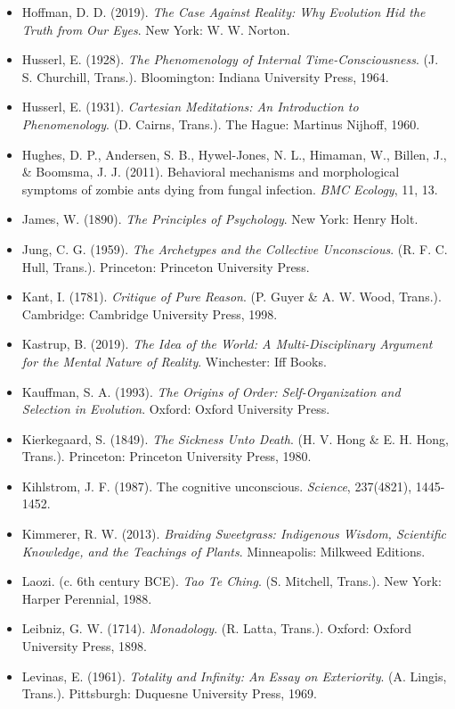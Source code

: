 \begin{itemize}[nosep,leftmargin=*]
  \item Hoffman, D. D. (2019). \textit{The Case Against Reality: Why Evolution Hid the Truth from Our Eyes}. New York: W. W. Norton.
  \item Husserl, E. (1928). \textit{The Phenomenology of Internal Time-Consciousness}. (J. S. Churchill, Trans.). Bloomington: Indiana University Press, 1964.
  \item Husserl, E. (1931). \textit{Cartesian Meditations: An Introduction to Phenomenology}. (D. Cairns, Trans.). The Hague: Martinus Nijhoff, 1960.
  \item Hughes, D. P., Andersen, S. B., Hywel-Jones, N. L., Himaman, W., Billen, J., \& Boomsma, J. J. (2011). Behavioral mechanisms and morphological symptoms of zombie ants dying from fungal infection. \textit{BMC Ecology}, 11, 13.
  \item James, W. (1890). \textit{The Principles of Psychology}. New York: Henry Holt.
  \item Jung, C. G. (1959). \textit{The Archetypes and the Collective Unconscious}. (R. F. C. Hull, Trans.). Princeton: Princeton University Press.
  \item Kant, I. (1781). \textit{Critique of Pure Reason}. (P. Guyer \& A. W. Wood, Trans.). Cambridge: Cambridge University Press, 1998.
  \item Kastrup, B. (2019). \textit{The Idea of the World: A Multi-Disciplinary Argument for the Mental Nature of Reality}. Winchester: Iff Books.
  \item Kauffman, S. A. (1993). \textit{The Origins of Order: Self-Organization and Selection in Evolution}. Oxford: Oxford University Press.
  \item Kierkegaard, S. (1849). \textit{The Sickness Unto Death}. (H. V. Hong \& E. H. Hong, Trans.). Princeton: Princeton University Press, 1980.
  \item Kihlstrom, J. F. (1987). The cognitive unconscious. \textit{Science}, 237(4821), 1445-1452.
  \item Kimmerer, R. W. (2013). \textit{Braiding Sweetgrass: Indigenous Wisdom, Scientific Knowledge, and the Teachings of Plants}. Minneapolis: Milkweed Editions.
  \item Laozi. (c. 6th century BCE). \textit{Tao Te Ching}. (S. Mitchell, Trans.). New York: Harper Perennial, 1988.
  \item Leibniz, G. W. (1714). \textit{Monadology}. (R. Latta, Trans.). Oxford: Oxford University Press, 1898.
  \item Levinas, E. (1961). \textit{Totality and Infinity: An Essay on Exteriority}. (A. Lingis, Trans.). Pittsburgh: Duquesne University Press, 1969.

\end{itemize}
